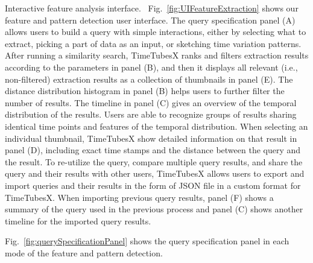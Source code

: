 \textsf{Interactive feature analysis interface.\ } 
Fig.~\ref{fig:UIFeatureExtraction} shows our feature and pattern detection user interface. 
The query specification panel (A) allows users %
to build a query with simple interactions, either by selecting what to extract, picking a part of data as an input, or sketching time variation patterns.
After running a similarity search, 
TimeTubesX ranks and filters extraction results according to the parameters in panel (B),
and then it displays all relevant (i.e., non-filtered) extraction results as a collection of thumbnails in panel (E).
The distance distribution histogram in panel (B) helps users to further filter the number of results.
The timeline in panel (C) gives an overview of the temporal distribution of the results.
Users are able to recognize groups of results sharing identical time points and features of the temporal distribution.
When selecting an individual thumbnail, TimeTubesX show detailed information on that result in panel (D), including exact time stamps and the distance between the query and the result.
To re-utilize the query, compare multiple query results, and share the query and their results with other users, 
TimeTubesX allows users to export and import queries and their results in the form of JSON file in a custom format for TimeTubesX.
When importing previous query results,
panel (F) shows a summary of the query used in the previous process and panel (C) shows another timeline for the imported query results.

Fig.~\ref{fig:querySpecificationPanel} shows the query specification panel in each mode of the feature and pattern detection.

